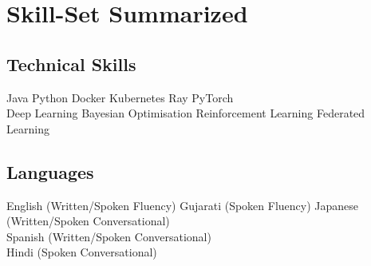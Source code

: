 \documentclass[a4paper]{deedy-resume} %
\begin{document}
\section{Skill-Set Summarized}

\begin{minipage}[t]{0.45\textwidth}

\subsection{Technical Skills}
Java \textbullet{} Python \textbullet{} Docker \textbullet{} Kubernetes \textbullet{} Ray \textbullet{} PyTorch  \\  Deep Learning \textbullet{} Bayesian Optimisation \textbullet{} Reinforcement Learning \textbullet{} Federated Learning

\end{minipage}
\begin{minipage}[t]{10\textwidth}
\end{minipage}
\begin{minipage}[t]{0.45\textwidth}
\subsection{Languages}
English (Written/Spoken Fluency) \textbullet{} Gujarati (Spoken Fluency) \textbullet{} Japanese (Written/Spoken Conversational) \textbullet{} \\  Spanish (Written/Spoken Conversational)  \textbullet{} \\  Hindi (Spoken Conversational)

\end{minipage}
\end{document}
